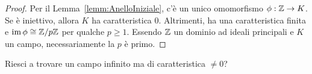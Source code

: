 \begin{proof}
Per il Lemma~\ref{lemm:AnelloIniziale}, c'è un unico omomorfismo $\phi : \mathbb{Z} \to K$. Se è iniettivo, allora $K$ ha caratteristica $0$. Altrimenti, ha una caratteristica finita e $\operatorname{im} \phi \cong \mathbb{Z}/p\mathbb{Z}$ per qualche $p \ge 1$. Essendo $\mathbb{Z}$ un dominio ad ideali principali e $K$ un campo, necessariamente la $p$ è primo.
\end{proof}

\begin{eser}
Riesci a trovare un campo infinito ma di caratteristica $\ne 0$?
\end{eser}

%
%





